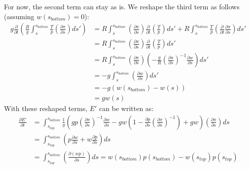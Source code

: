 For now, the second term can stay as is.
We reshape the third term as follows (assuming $w(s_{bottom})=0$):
\begin{align*}
g\frac{\partial}{\partial t}\left(\frac{R}{g}\int _s ^{s_{bottom}} \frac{T}{p}\left(\frac{\partial \pi}{\partial s}\right)ds'\right) &= R\int _s ^{s_{bottom}} \left(\frac{\partial \pi}{\partial s}\right)\frac{\partial}{\partial t}\left(\frac{T}{p}\right)ds' + R\int _s ^{s_{bottom}} \frac{T}{p}\left(\frac{\partial}{\partial t}\frac{\partial \pi}{\partial s}\right)ds'\\
&= R\int _s ^{s_{bottom}} \left(\frac{\partial \pi}{\partial s}\right)\frac{\partial}{\partial t}\left(\frac{T}{p}\right)ds'\\
&= R\int _s ^{s_{bottom}} \left(\frac{\partial \pi}{\partial s}\right)\left(-\frac{g}{R}\left(\frac{\partial\pi}{\partial s}\right)^{-1}\frac{\partial w}{\partial s}\right)ds'\\
&= -g\int _s ^{s_{bottom}} \left(\frac{\partial w}{\partial s}\right)ds'\\
&= -g\left( w(s_{bottom}) - w(s) \right)\\
&= gw(s)
\end{align*}
With these reshaped terms, $E'$ can be written as:
\begin{align*}
\frac{\partial E'}{\partial t} &= \int_{s_{top}}^{s_{bottom}} \frac{1}{g}\left(gp\left(\frac{\partial \pi}{\partial s}\right)^{-1} \frac{\partial w}{\partial s}-gw\left(1 - \frac{\partial p}{\partial s}\left(\frac{\partial \pi}{\partial s}\right)^{-1}\right)+gw \right)\left( \frac{\partial \pi}{\partial s} \right) ds\\
&=\int_{s_{top}}^{s_{bottom}} \left(p \frac{\partial w}{\partial s}+w\frac{\partial p}{\partial s}\right) ds\\
&=\int_{s_{top}}^{s_{bottom}} \left(\frac{\partial (wp)}{\partial s}\right) ds = w(s_{bottom})p(s_{bottom})-w(s_{top})p(s_{top})
\end{align*}


